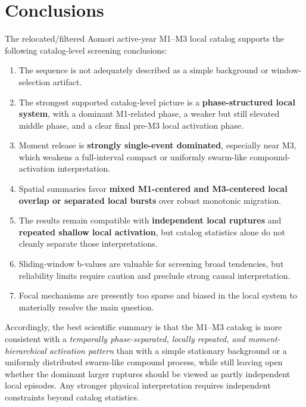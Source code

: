 \documentclass[11pt]{article}
\begin{document}
\section{Conclusions}
The relocated/filtered Aomori active-year M1--M3 local catalog supports the following catalog-level screening conclusions:
\begin{enumerate}[leftmargin=2em]
    \item The sequence is not adequately described as a simple background or window-selection artifact.
    \item The strongest supported catalog-level picture is a \textbf{phase-structured local system}, with a dominant M1-related phase, a weaker but still elevated middle phase, and a clear final pre-M3 local activation phase.
    \item Moment release is \textbf{strongly single-event dominated}, especially near M3, which weakens a full-interval compact or uniformly swarm-like compound-activation interpretation.
    \item Spatial summaries favor \textbf{mixed M1-centered and M3-centered local overlap or separated local bursts} over robust monotonic migration.
    \item The results remain compatible with \textbf{independent local ruptures} and \textbf{repeated shallow local activation}, but catalog statistics alone do not cleanly separate those interpretations.
    \item Sliding-window b-values are valuable for screening broad tendencies, but reliability limits require caution and preclude strong causal interpretation.
    \item Focal mechanisms are presently too sparse and biased in the local system to materially resolve the main question.
\end{enumerate}

Accordingly, the best scientific summary is that the M1--M3 catalog is more consistent with a \emph{temporally phase-separated, locally repeated, and moment-hierarchical activation pattern} than with a simple stationary background or a uniformly distributed swarm-like compound process, while still leaving open whether the dominant larger ruptures should be viewed as partly independent local episodes. Any stronger physical interpretation requires independent constraints beyond catalog statistics.
\end{document}
